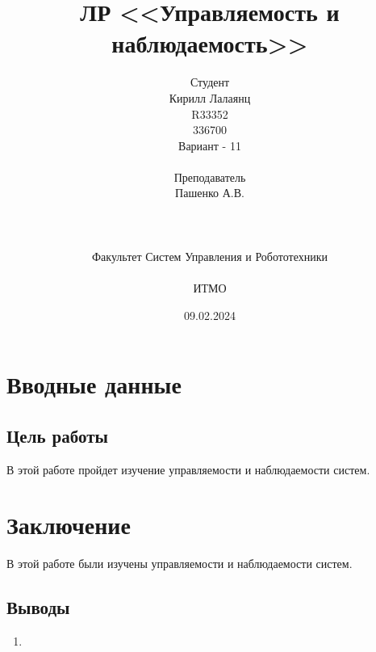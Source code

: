 \documentclass[16pt]{article}
\title{ЛР \textnumero 7 <<Управляемость и наблюдаемость>>}
\author{
Студент \\
Кирилл Лалаянц\\
R33352\\
336700\\
Вариант - 11\\
\\
Преподаватель\\
Пашенко А.В. \\
\\
\\
\\
Факультет Систем Управления и Робототехники\\
\\
ИТМО\\
}
\date{09.02.2024}
\begin{document}
\maketitle
\newpage
\tableofcontents
\thispagestyle{empty}

\newpage
\setcounter{page}{1}
\section{Вводные данные}
\subsection{Цель работы}
В этой работе пройдет изучение управляемости и наблюдаемости систем.

\newpage


\newpage
\section{Заключение}
В этой работе были изучены управляемости и наблюдаемости систем.
\subsection{Выводы}
\begin{enumerate}
   \item 
\end{enumerate}
\end{document}
